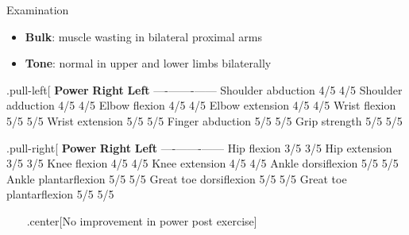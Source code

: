 \documentclass[
  ignorenonframetext,
]{beamer}
\providecommand{\tightlist}{%
  \setlength{\itemsep}{0pt}\setlength{\parskip}{0pt}}
\begin{document}
\begin{frame}{Examination}
\protect\hypertarget{examination-1}{}
\begin{itemize}
\tightlist
\item
  \textbf{Bulk}: muscle wasting in bilateral proximal arms
\item
  \textbf{Tone}: normal in upper and lower limbs bilaterally
\end{itemize}

.pull-left{[} \textbar{} \textbf{Power} \textbar{} \textbf{Right}
\textbar{} \textbf{Left} \textbar{}
\textbar----\textbar-------\textbar------\textbar{} \textbar{} Shoulder
abduction \textbar{} 4/5 \textbar{} 4/5 \textbar{} \textbar{} Shoulder
adduction \textbar{} 4/5 \textbar{} 4/5\textbar{} \textbar{} Elbow
flexion \textbar{} 4/5 \textbar{} 4/5\textbar{} \textbar{} Elbow
extension \textbar{} 4/5 \textbar{} 4/5\textbar{} \textbar{} Wrist
flexion \textbar{} 5/5 \textbar{} 5/5\textbar{} \textbar{} Wrist
extension \textbar{} 5/5 \textbar{} 5/5\textbar{} \textbar{} Finger
abduction \textbar{} 5/5 \textbar{} 5/5\textbar{} \textbar{} Grip
strength \textbar{} 5/5 \textbar{} 5/5\textbar{]}

.pull-right{[} \textbar{} \textbf{Power} \textbar{} \textbf{Right}
\textbar{} \textbf{Left} \textbar{}
\textbar----\textbar-------\textbar------\textbar{} \textbar{} Hip
flexion \textbar{} 3/5 \textbar{} 3/5\textbar{} \textbar{} Hip extension
\textbar{} 3/5 \textbar{} 3/5\textbar{} \textbar{} Knee flexion
\textbar{} 4/5 \textbar{} 4/5\textbar{} \textbar{} Knee extension
\textbar{} 4/5 \textbar{} 4/5\textbar{} \textbar{} Ankle dorsiflexion
\textbar{} 5/5 \textbar{} 5/5\textbar{} \textbar{} Ankle plantarflexion
\textbar{} 5/5 \textbar{} 5/5\textbar{} \textbar{} Great toe
dorsiflexion \textbar{} 5/5 \textbar{} 5/5\textbar{} \textbar{} Great
toe plantarflexion \textbar{} 5/5 \textbar{} 5/5\textbar{]}

~~~ .center{[}No improvement in power post exercise{]}
\end{frame}
\end{document}

